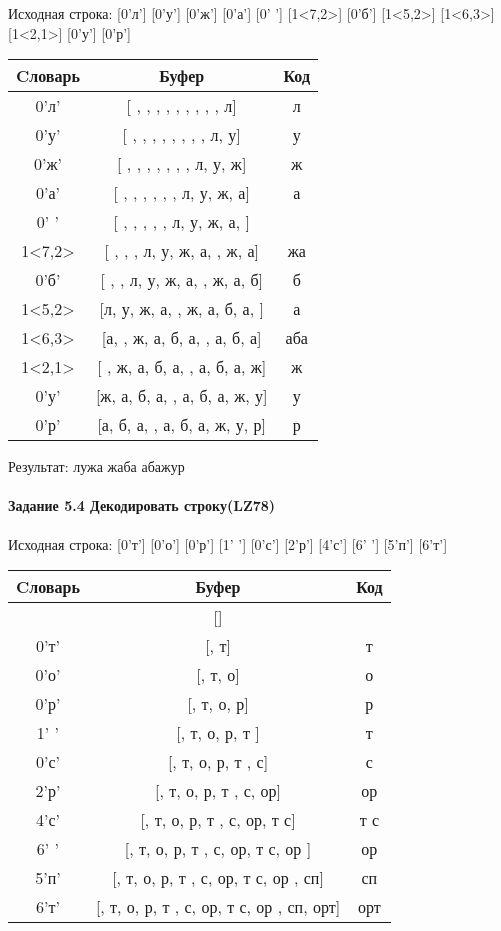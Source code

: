 \documentclass[a4paper, 12pt]{article}
\begin{document}
Исходная строка: [0'л'] [0'у'] [0'ж'] [0'а'] [0' '] [1<7,2>] [0'б'] [1<5,2>] [1<6,3>] [1<2,1>] [0'у'] [0'р']\\
\begin{table}[h!]
\centering
\begin{tabular}{|c|c|c|}
\hline
 Cловарь & Буфер & Код  \\ \hline
0'л' & [ ,  ,  ,  ,  ,  ,  ,  ,  , л] & л
\\ \hline
0'у' & [ ,  ,  ,  ,  ,  ,  ,  , л, у] & у
\\ \hline
0'ж' & [ ,  ,  ,  ,  ,  ,  , л, у, ж] & ж
\\ \hline
0'а' & [ ,  ,  ,  ,  ,  , л, у, ж, а] & а
\\ \hline
0' ' & [ ,  ,  ,  ,  , л, у, ж, а,  ] &  
\\ \hline
1<7,2> & [ ,  ,  , л, у, ж, а,  , ж, а] & жа
\\ \hline
0'б' & [ ,  , л, у, ж, а,  , ж, а, б] & б
\\ \hline
1<5,2> & [л, у, ж, а,  , ж, а, б, а,  ] & а 
\\ \hline
1<6,3> & [а,  , ж, а, б, а,  , а, б, а] & аба
\\ \hline
1<2,1> & [ , ж, а, б, а,  , а, б, а, ж] & ж
\\ \hline
0'у' & [ж, а, б, а,  , а, б, а, ж, у] & у
\\ \hline
0'р' & [а, б, а,  , а, б, а, ж, у, р] & р
\\ \hline
\end{tabular}
\end{table}

Результат: лужа жаба абажур
\pagebreak
\paragraph{Задание 5.4 Декодировать строку(LZ78)\\}

Исходная строка: [0'т'] [0'о'] [0'р'] [1' '] [0'с'] [2'р'] [4'с'] [6' '] [5'п'] [6'т']\\
\begin{table}[h!]
\centering
\begin{tabular}{|c|c|c|}
\hline
 Cловарь & Буфер & Код  \\ \hline
 & [] & 
\\ \hline
0'т' & [, т] & т
\\ \hline
0'о' & [, т, о] & о
\\ \hline
0'р' & [, т, о, р] & р
\\ \hline
1' ' & [, т, о, р, т ] & т 
\\ \hline
0'с' & [, т, о, р, т , с] & с
\\ \hline
2'р' & [, т, о, р, т , с, ор] & ор
\\ \hline
4'с' & [, т, о, р, т , с, ор, т с] & т с
\\ \hline
6' ' & [, т, о, р, т , с, ор, т с, ор ] & ор 
\\ \hline
5'п' & [, т, о, р, т , с, ор, т с, ор , сп] & сп
\\ \hline
6'т' & [, т, о, р, т , с, ор, т с, ор , сп, орт] & орт
\\ \hline
\end{tabular}
\end{table}
\end{document}
